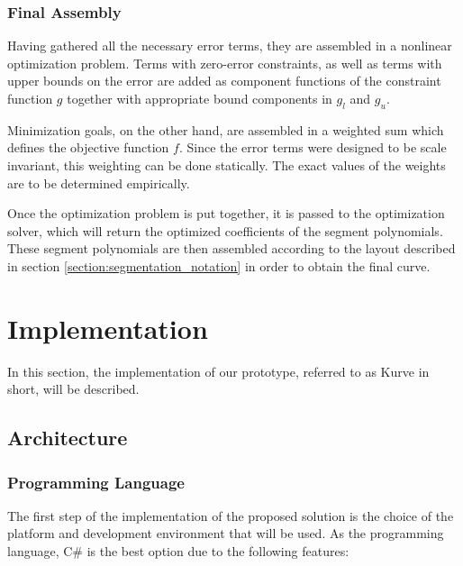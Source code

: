 \documentclass[a4paper]{article}
\begin{document}
			\subsubsection{Final Assembly}
			\label{section:final_assembly}

				Having gathered all the necessary error terms, they are assembled in a nonlinear optimization problem. Terms with zero-error constraints, as well as terms with upper bounds on the error are added as component functions of the constraint function \(g\) together with appropriate bound components in \(g_l\) and \(g_u\).

				Minimization goals, on the other hand, are assembled in a weighted sum which defines the objective function \(f\). Since the error terms were designed to be scale invariant, this weighting can be done statically. The exact values of the weights are to be determined empirically.

				Once the optimization problem is put together, it is passed to the optimization solver, which will return the optimized coefficients of the segment polynomials. These segment polynomials are then assembled according to the layout described in section \ref{section:segmentation_notation} in order to obtain the final curve.

	\section{Implementation}
	
		In this section, the implementation of our prototype, referred to as Kurve in short, will be described.

		\subsection{Architecture}
			
			\subsubsection{Programming Language}
			
				The first step of the implementation of the proposed solution is the choice of the platform and development environment that will be used. 
				As the programming language, C\# is the best option due to the following features:
				
\end{document}
